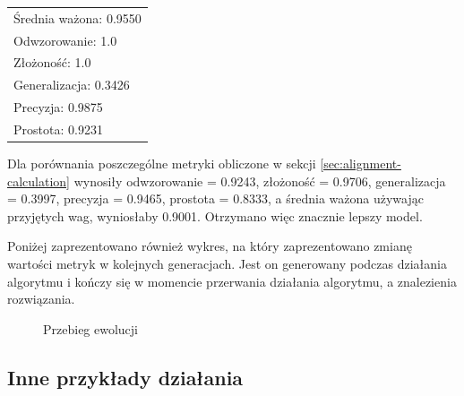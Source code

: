  \begin{center}
  \begin{tabular}{l}
	Średnia ważona: 0.9550 \\
	Odwzorowanie: 1.0 \\
	Złożoność: 1.0 \\
	Generalizacja: 0.3426 \\
	Precyzja: 0.9875 \\
	Prostota: 0.9231
  \end{tabular}
 \end{center}

Dla porównania poszczególne metryki obliczone w sekcji \ref{sec:alignment-calculation} wynosiły odwzorowanie = 0.9243, złożoność = 0.9706, generalizacja = 0.3997, precyzja = 0.9465, prostota = 0.8333, a średnia ważona używając przyjętych wag, wyniosłaby 0.9001. Otrzymano więc znacznie lepszy model.

Poniżej zaprezentowano również wykres, na który zaprezentowano zmianę wartości metryk w kolejnych generacjach. Jest on generowany podczas działania algorytmu i kończy się w momencie przerwania działania algorytmu, a znalezienia rozwiązania.
\begin{figure}[!ht]
	\caption{\label{fig:flow_chart}Przebieg ewolucji}
\end{figure}

\subsection{Inne przykłady działania}


